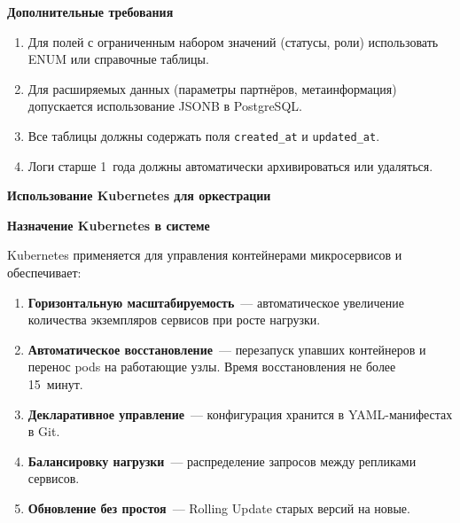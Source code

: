 \documentclass{bmstu}
\begin{document}
\begin{center}
    \textbf{Дополнительные требования}
\end{center}

\begin{enumerate}
    \item Для полей с ограниченным набором значений (статусы, роли) использовать ENUM или справочные таблицы.
    
    \item Для расширяемых данных (параметры партнёров, метаинформация) допускается использование JSONB в PostgreSQL.
    
    \item Все таблицы должны содержать поля \texttt{created\_at} и \texttt{updated\_at}.
    
    \item Логи старше 1~года должны автоматически архивироваться или удаляться.
\end{enumerate}

\begin{center}
    \textbf{Использование Kubernetes для оркестрации}
\end{center}

\begin{center}
    \textbf{Назначение Kubernetes в системе}
\end{center}

Kubernetes применяется для управления контейнерами микросервисов и обеспечивает:

\begin{enumerate}
    \item \textbf{Горизонтальную масштабируемость}~--- автоматическое увеличение количества экземпляров сервисов при росте нагрузки.
    
    \item \textbf{Автоматическое восстановление}~--- перезапуск упавших контейнеров и перенос pods на работающие узлы. Время восстановления не более 15~минут.
    
    \item \textbf{Декларативное управление}~--- конфигурация хранится в YAML-манифестах в Git.
    
    \item \textbf{Балансировку нагрузки}~--- распределение запросов между репликами сервисов.
    
    \item \textbf{Обновление без простоя}~--- Rolling Update старых версий на новые.
\end{enumerate}
\end{document}
